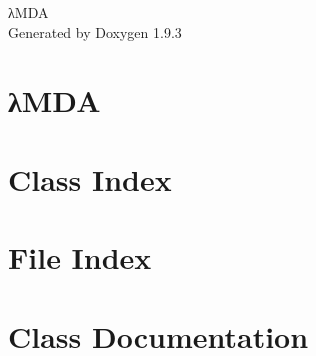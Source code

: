 \documentclass[twoside]{book}
\newcommand{\+}{\discretionary{\mbox{\scriptsize$\hookleftarrow$}}{}{}}
\newcommand{\clearemptydoublepage}{%
    \newpage{\pagestyle{empty}\cleardoublepage}%
  }
\begin{document}
  \raggedbottom
    \hypersetup{pageanchor=false,
                bookmarksnumbered=true,
                pdfencoding=unicode
               }
  \begin{titlepage}
  \vspace*{7cm}
  \begin{center}%
  {\Large λ\+MDA}\\
  \vspace*{1cm}
  {\large Generated by Doxygen 1.9.3}\\
  \end{center}
  \end{titlepage}
  \clearemptydoublepage
  \tableofcontents
  \clearemptydoublepage
  \hypersetup{pageanchor=true}
\chapter{λ\+MDA}
\label{md_readme}

\chapter{Class Index}

\chapter{File Index}

\chapter{Class Documentation}


















\end{document}
